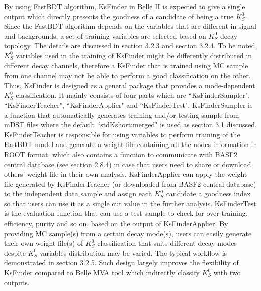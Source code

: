 By using FastBDT algorithm, KsFinder in Belle II is expected to give a single output which directly presents the goodness of a candidate of being a true $K_S^0$. Since the FastBDT algorithm depends on the variables that are different in signal and backgrounds, a set of training variables are selected based on $K_S^0$ decay topology. The details are discussed in section 3.2.3 and section 3.2.4. To be noted, $K_S^0$ variables used in the training of KsFinder might be differently distributed in different decay channels, therefore a KsFinder that is trained using MC sample from one channel may not be able to perform a good classification on the other. Thus, KsFinder is designed as a general package that provides a mode-dependent $K_S^0$ classification. It mainly consists of four parts which are ``KsFinderSampler", ``KsFinderTeacher", ``KsFinderApplier" and ``KsFinderTest". KsFinderSampler is a function that automatically generates training and/or testing sample from mDST files where the default ``stdKshort:merged" is used as section 3.1 discussed. KsFinderTeacher is responsible for using variables to perform training of the FastBDT model and generate a weight file containing all the nodes information in ROOT format, which also contains a function to communicate with BASF2 central database (see section 2.8.4) in case that users need to share or download others' weight file in their own analysis. KsFinderApplier can apply the weight file generated by KsFinderTeacher (or downloaded from BASF2 central database) to the independent data sample and assign each $K_S^0$ candidate a goodness index so that users can use it as a single cut value in the further analysis. KsFinderTest is the evaluation function that can use a test sample to check for over-training, efficiency, purity and so on, based on the output of KsFinderApplier.  By providing MC sample(s) from a certain decay mode(s), users can easily generate their own weight file(s) of $K_S^0$ classification that suits different decay modes despite $K_S^0$ variables distribution may be varied. The typical workflow is demonstrated in section 3.2.5. Such design largely improves the flexibility of KsFinder compared to Belle MVA tool which indirectly classify $K_S^0$ with two outputs. 


